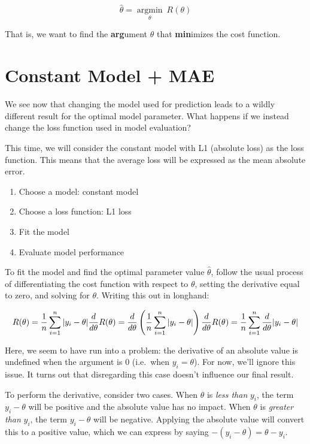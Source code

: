 \documentclass[
  letterpaper,
  DIV=11,
  numbers=noendperiod]{scrreprt}
\providecommand{\tightlist}{%
  \setlength{\itemsep}{0pt}\setlength{\parskip}{0pt}}\usepackage{longtable,booktabs,array}
\begin{document}
\[\hat{\theta} = \underset{\theta}{\operatorname{\arg\min}}\:R(\theta)\]

That is, we want to find the \textbf{arg}ument \(\theta\) that
\textbf{min}imizes the cost function.

\hypertarget{constant-model-mae}{%
\section{Constant Model + MAE}\label{constant-model-mae}}

We see now that changing the model used for prediction leads to a wildly
different result for the optimal model parameter. What happens if we
instead change the loss function used in model evaluation?

This time, we will consider the constant model with L1 (absolute loss)
as the loss function. This means that the average loss will be expressed
as the mean absolute error.

\begin{enumerate}
\def\labelenumi{\arabic{enumi}.}
\tightlist
\item
  Choose a model: constant model
\item
  Choose a loss function: L1 loss
\item
  Fit the model
\item
  Evaluate model performance
\end{enumerate}

To fit the model and find the optimal parameter value \(\hat{\theta}\),
follow the usual process of differentiating the cost function with
respect to \(\theta\), setting the derivative equal to zero, and solving
for \(\theta\). Writing this out in longhand:

\[
R(\theta) = \frac{1}{n}\sum^{n}_{i=1} |y_i - \theta| \\
\frac{d}{d\theta} R(\theta) = \frac{d}{d\theta} \left(\frac{1}{n} \sum^{n}_{i=1} |y_i - \theta| \right) \\
\frac{d}{d\theta} R(\theta) = \frac{1}{n} \sum^{n}_{i=1} \frac{d}{d\theta} |y_i - \theta|
\]

Here, we seem to have run into a problem: the derivative of an absolute
value is undefined when the argument is 0 (i.e.~when \(y_i = \theta\)).
For now, we'll ignore this issue. It turns out that disregarding this
case doesn't influence our final result.

To perform the derivative, consider two cases. When \(\theta\) is
\emph{less than} \(y_i\), the term \(y_i - \theta\) will be positive and
the absolute value has no impact. When \(\theta\) is \emph{greater than}
\(y_i\), the term \(y_i - \theta\) will be negative. Applying the
absolute value will convert this to a positive value, which we can
express by saying \(-(y_i - \theta) = \theta - y_i\).
\end{document}
